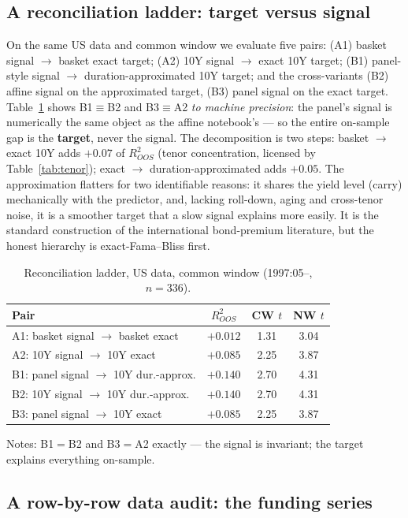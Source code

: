\documentclass[11pt]{article}
\begin{document}
\subsection{A reconciliation ladder: target versus signal}

On the same US data and common window we evaluate five pairs: (A1) basket signal
$\to$ basket exact target; (A2) 10Y signal $\to$ exact 10Y target; (B1) panel-style signal
$\to$ duration-approximated 10Y target; and the cross-variants (B2) affine signal on the
approximated target, (B3) panel signal on the exact target.
Table~\ref{tab:ladder} shows B1$\equiv$B2 and B3$\equiv$A2 \emph{to machine precision}: the
panel's signal is numerically the same object as the affine notebook's --- so the entire
on-sample gap is the \textbf{target}, never the signal. The decomposition is two steps:
basket $\to$ exact 10Y adds $+0.07$ of $R^2_{OOS}$ (tenor concentration, licensed by
Table~\ref{tab:tenor}); exact $\to$ duration-approximated adds $+0.05$. The approximation
flatters for two identifiable reasons: it shares the yield level (carry) mechanically with
the predictor, and, lacking roll-down, aging and cross-tenor noise, it is a smoother target
that a slow signal explains more easily. It is the standard construction of the
international bond-premium literature, but the honest hierarchy is exact-Fama--Bliss
first.

\begin{table}[t]\centering
\caption{Reconciliation ladder, US data, common window (1997:05--, $n=336$).}
\label{tab:ladder}
\begin{tabular}{lccc}
\toprule
Pair & $R^2_{OOS}$ & CW $t$ & NW $t$ \\
\midrule
A1: basket signal $\to$ basket exact & $+0.012$ & 1.31 & 3.04 \\
A2: 10Y signal $\to$ 10Y exact & $+0.085$ & 2.25 & 3.87 \\
B1: panel signal $\to$ 10Y dur.-approx. & $+0.140$ & 2.70 & 4.31 \\
B2: 10Y signal $\to$ 10Y dur.-approx. & $+0.140$ & 2.70 & 4.31 \\
B3: panel signal $\to$ 10Y exact & $+0.085$ & 2.25 & 3.87 \\
\bottomrule
\end{tabular}
\par\smallskip
\footnotesize Notes: B1$=$B2 and B3$=$A2 exactly --- the signal is invariant; the target
explains everything on-sample.
\end{table}

\subsection{A row-by-row data audit: the funding series}
\end{document}
